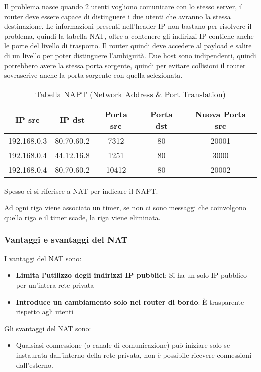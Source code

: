 \documentclass[a4paper]{article}
\begin{document}
\vspace{1em}
\noindent
Il problema
nasce quando 2 utenti vogliono comunicare con lo stesso server, il router deve essere
capace di distinguere i due utenti che avranno la stessa destinazione.
Le informazioni presenti nell'header IP non bastano per risolvere il problema, quindi
la tabella NAT, oltre a contenere gli indirizzi IP contiene anche le porte del livello
di trasporto. Il router quindi deve accedere al payload e salire di un livello per
poter distinguere l'ambiguità. Due host sono indipendenti, quindi potrebbero avere
la stessa porta sorgente, quindi per evitare collisioni il router sovrascrive anche
la porta sorgente con quella selezionata.
\begin{table}[H]
  \centering
  \begin{tabular}{c|c|c|c|c}
    IP src& IP dst & Porta src & Porta dst & Nuova Porta src\\
    \hline
    192.168.0.3 & 80.70.60.2 & 7312 & 80 & 20001 \\
    192.168.0.4 & 44.12.16.8 & 1251 & 80 & 3000 \\
    192.168.0.4 & 80.70.60.2 & 10412 & 80 & 20002 \\
  \end{tabular}
  \caption{Tabella NAPT (Network Address \& Port Translation)}
\end{table}
\noindent
Spesso ci si riferisce a NAT per indicare il NAPT.

\vspace{1em}
\noindent
Ad ogni riga viene associato un timer, se non ci sono messaggi che coinvolgono quella riga
e il timer scade, la riga viene eliminata.

\subsubsection{Vantaggi e svantaggi del NAT}
I vantaggi del NAT sono:
\begin{itemize}
  \item \textbf{Limita l'utilizzo degli indirizzi IP pubblici}: Si ha un solo IP pubblico
    per un'intera rete privata

  \item \textbf{Introduce un cambiamento solo nei router di bordo}: È trasparente rispetto agli
    utenti
\end{itemize}

\noindent
Gli svantaggi del NAT sono:
\begin{itemize}
  \item Qualsiasi connessione (o canale di comunicazione) può iniziare solo se instaurata
    dall'interno della rete privata, non è possibile ricevere connessioni dall'esterno.
\end{itemize}
\end{document}
